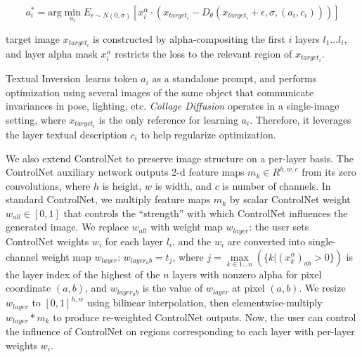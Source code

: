 \vspace{-0.5em}
\begin{dmath}
a^*_i = \mathrm{arg}\min_{a_i} E_{\epsilon \sim N(0,\sigma)}[x^\alpha_i\cdot(x_{target_i} - D_\theta(x_{target_i} + \epsilon, \sigma, (a_i,c_i)))]
\end{dmath}
\vspace{-0.5em}

\noindent target image $x_{target_i}$ is constructed by alpha-compositing the first $i$ layers $l_1 \dots l_i$, and layer alpha mask $x^\alpha_i$ restricts the loss to the relevant region of $x_{target_i}$. 

Textual Inversion\,\cite{TextualInversion} learns token $a_i$ as a standalone prompt, and performs optimization using several images of the same object that communicate invariances in pose, lighting, etc. 
\textit{Collage Diffusion} operates in a single-image setting, where $x_{target_i}$ is the only reference for learning $a_i$. Therefore, it leverages the layer textual description $c_i$ to help regularize optimization. 

We also extend ControlNet \cite{zhang2023adding} to preserve image structure on a per-layer basis. 
The ControlNet auxiliary network outputs 2-d feature maps $m_k \in R^{h, w, c}$ from its zero convolutions, where $h$ is height, $w$ is width, and $c$ is number of channels. 
In standard ControlNet, we multiply feature maps $m_k$ by scalar ControlNet weight $w_{all} \in [0, 1]$ that controls the ``strength'' with which ControlNet influences the generated image. 
We replace $w_{all}$ with weight map $w_{layer}$:
the user sets ControlNet weights $w_i$ for each layer $l_i$, and the $w_i$ are converted into single-channel weight map $w_{layer}$: $w_{layer_ab} = t_j$, where $j = \max\limits_{k \in 1 \dots n}(\{k | (x^\alpha_{k})_{ab}  > 0\})$ is the layer index of the highest of the $n$ layers with nonzero alpha for pixel coordinate $(a,b)$, and $w_{layer_ab}$ is the value of $w_{layer}$ at pixel $(a,b)$.
We resize $w_{layer}$ to $[0, 1]^{h,w}$ using bilinear interpolation, then elementwise-multiply $w_{layer} * m_k$ to produce re-weighted ControlNet outputs. 
Now, the user can control the influence of ControlNet on regions corresponding to each layer with per-layer weights $w_i$. 

\vspace{-0.5em}
